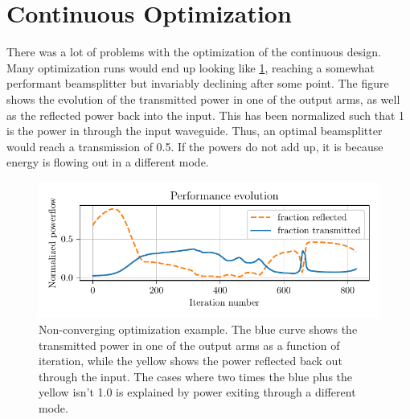 \section{Continuous Optimization}\label{sec:res_cont}

There was a lot of problems with the optimization of the continuous design.
Many optimization runs would end up looking like \cref{fig:bad_cont_conv},
reaching a somewhat performant beamsplitter but invariably declining after some
point.
The figure shows the evolution of the transmitted power in one of the
output arms, as well as the reflected power back into the input.
This has been normalized such that 1 is the power in through the input waveguide.
Thus, an optimal beamsplitter would reach a transmission of 0.5.
If the powers do not add up, it is because energy is flowing out in a different
mode.

\begin{figure}[htpb]
	\centering
	\includegraphics{chapters/results/conv_22.pdf}
	\caption{%
		Non-converging optimization example. The blue curve shows the
		transmitted power in one of the output arms as a function of iteration,
		while the yellow shows the power reflected back out through the input.
		The cases where two times the blue plus the yellow isn't 1.0 is
		explained by power exiting through a different mode.
	}%
	\label{fig:bad_cont_conv}
\end{figure}

